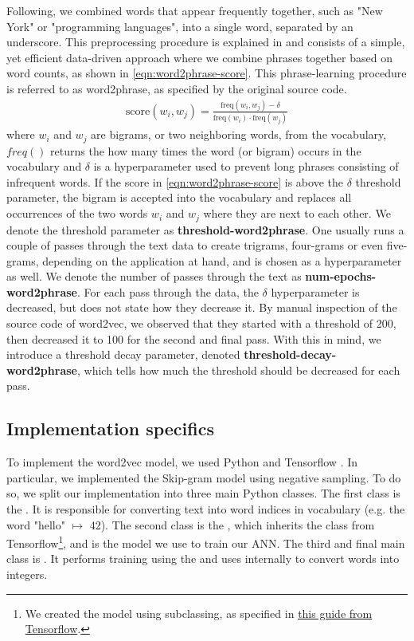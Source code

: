 Following, we combined words that appear frequently together, such as "New York" or "programming languages", into a single word, separated by an underscore. This preprocessing procedure is explained in \cite[4 Learning Phrases]{mikolov2013b} and consists of a simple, yet efficient data-driven approach where we combine phrases together based on word counts, as shown in \cref{eqn:word2phrase-score}. This phrase-learning procedure is referred to as word2phrase, as specified by the original source code.
\begin{align}
    \label{eqn:word2phrase-score}
    \text{score}(w_i, w_j) = \frac{\text{freq}(w_i, w_j) - \delta}{\text{freq}(w_i) \cdot \text{freq}(w_j)}
\end{align}
where $w_i$ and $w_j$ are bigrams, or two neighboring words, from the vocabulary, $freq()$ returns the how many times the word (or bigram) occurs in the vocabulary and $\delta$ is a hyperparameter used to prevent long phrases consisting of infrequent words. If the score in \cref{eqn:word2phrase-score} is above the $\delta$ threshold parameter, the bigram is accepted into the vocabulary and replaces all occurrences of the two words $w_i$ and $w_j$ where they are next to each other. We denote the threshold parameter as \textbf{threshold-word2phrase}. One usually runs a couple of passes through the text data to create trigrams, four-grams or even five-grams, depending on the application at hand, and is chosen as a hyperparameter as well. We denote the number of passes through the text as \textbf{num-epochs-word2phrase}. For each pass through the data, the $\delta$ hyperparameter is decreased, but \cite{mikolov2013b} does not state how they decrease it. By manual inspection of the source code of word2vec, we observed that they started with a threshold of 200, then decreased it to 100 for the second and final pass. With this in mind, we introduce a threshold decay parameter, denoted \textbf{threshold-decay-word2phrase}, which tells how much the threshold should be decreased for each pass.

\subsection{Implementation specifics}
To implement the word2vec model, we used Python and Tensorflow \cite{python3-2009, tensorflow2015-whitepaper}. In particular, we implemented the Skip-gram model using negative sampling. To do so, we split our implementation into three main Python classes. The first class is the . It is responsible for converting text into word indices in vocabulary (e.g. the word "hello" $\mapsto$ 42). The second class is the , which inherits the  class from Tensorflow\footnote{We created the model using subclassing, as specified in \href{https://www.tensorflow.org/guide/keras/custom_layers_and_models}{this guide from Tensorflow}.}, and is the model we use to train our ANN. The third and final main class is . It performs training using the  and uses  internally to convert words into integers.

